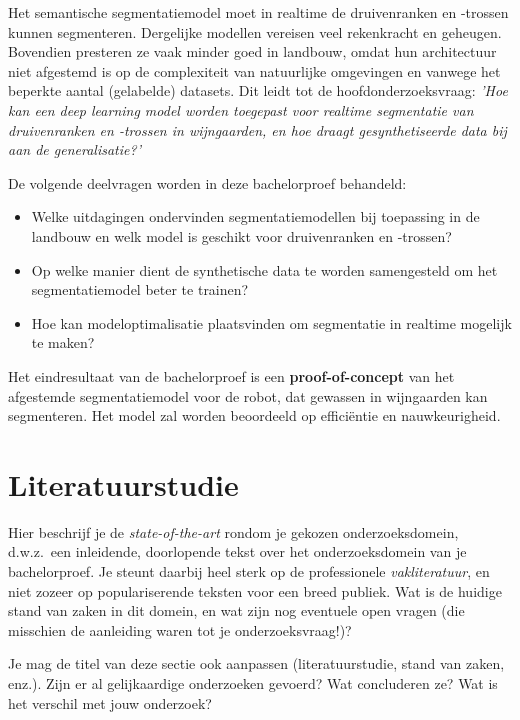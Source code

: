 Het semantische segmentatiemodel moet in realtime de druivenranken en -trossen kunnen segmenteren. Dergelijke modellen vereisen veel rekenkracht en geheugen. Bovendien presteren ze vaak minder goed in landbouw, omdat hun architectuur niet afgestemd is op de complexiteit van natuurlijke omgevingen en vanwege het beperkte aantal (gelabelde) datasets. Dit leidt tot de hoofdonderzoeksvraag: \emph{'Hoe kan een deep learning model worden toegepast voor realtime segmentatie van druivenranken en -trossen in wijngaarden, en hoe draagt gesynthetiseerde data bij aan de generalisatie?'}

De volgende deelvragen worden in deze bachelorproef behandeld:
\begin{itemize}
    \setlength{\itemsep}{0pt}
    \setlength{\parskip}{0pt} 
    \item Welke uitdagingen ondervinden segmentatiemodellen bij toepassing in de landbouw en welk model is geschikt voor druivenranken en -trossen?
    \item Op welke manier dient de synthetische data te worden samengesteld om het segmentatiemodel beter te trainen?
    \item Hoe kan modeloptimalisatie plaatsvinden om segmentatie in realtime mogelijk te maken?
\end{itemize}

Het eindresultaat van de bachelorproef is een \textbf{proof-of-concept} van het afgestemde segmentatiemodel voor de robot, dat gewassen in wijngaarden kan segmenteren. Het model zal worden beoordeeld op efficiëntie en nauwkeurigheid.


\section{Literatuurstudie}%
\label{sec:literatuurstudie}

Hier beschrijf je de \emph{state-of-the-art} rondom je gekozen onderzoeksdomein, d.w.z.\ een inleidende, doorlopende tekst over het onderzoeksdomein van je bachelorproef. Je steunt daarbij heel sterk op de professionele \emph{vakliteratuur}, en niet zozeer op populariserende teksten voor een breed publiek. Wat is de huidige stand van zaken in dit domein, en wat zijn nog eventuele open vragen (die misschien de aanleiding waren tot je onderzoeksvraag!)?

Je mag de titel van deze sectie ook aanpassen (literatuurstudie, stand van zaken, enz.). Zijn er al gelijkaardige onderzoeken gevoerd? Wat concluderen ze? Wat is het verschil met jouw onderzoek?

